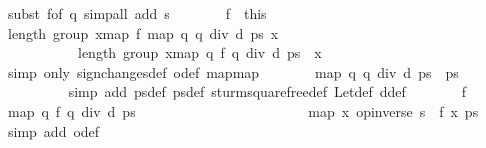 \begin{isabellebody}
\ {\isacharparenleft}subst\ f{\isacharbrackleft}of\ q{\isacharbrackright}{\isacharcomma}\ simp{\isacharunderscore}all\ add{\isacharcolon}\ s{\isacharparenright}\isanewline
\ \ \ \ \isacommand{{\isacharbraceright}}\isamarkupfalse%
\ \isamarkupfalse%
\ f{\isacharprime}\ {\isacharequal}\ this\isanewline
\ \ \ \ \isamarkupfalse%
\ {\isachardoublequoteopen}length\ {\isacharparenleft}group\ {\isacharbrackleft}x{\isasymleftarrow}map\ f\ {\isacharparenleft}map\ {\isacharparenleft}{\isasymlambda}q{\isachardot}\ q\ div\ d{\isacharparenright}\ ps{\isacharparenright}{\isachardot}\ x\ {\isasymnoteq}\ {}{\isacharbrackright}{\isacharparenright}\ {\isacharminus}\ {}\ {\isacharequal}\ \isanewline
\ \ \ \ \ \ \ \ \ \ \ length\ {\isacharparenleft}group\ {\isacharbrackleft}x{\isasymleftarrow}map\ {\isacharparenleft}{\isasymlambda}q{\isachardot}\ f\ {\isacharparenleft}q\ div\ d{\isacharparenright}{\isacharparenright}\ ps\ {\isachardot}\ x\ {\isasymnoteq}\ {}{\isacharbrackright}{\isacharparenright}\ {\isacharminus}\ {}{\isachardoublequoteclose}\isanewline
\ \ \ \ \ \ \ \ \isamarkupfalse%
\ {\isacharparenleft}simp\ only{\isacharcolon}\ sign{\isacharunderscore}changes{\isacharunderscore}def\ o{\isacharunderscore}def\ map{\isacharunderscore}map{\isacharparenright}\isanewline
\ \ \ \ \isamarkupfalse%
\ \isamarkupfalse%
\ {\isachardoublequoteopen}map\ {\isacharparenleft}{\isasymlambda}q{\isachardot}\ q\ div\ d{\isacharparenright}\ ps\ {\isacharequal}\ ps{\isacharprime}{\isachardoublequoteclose}\ \isanewline
\ \ \ \ \ \ \ \ \isamarkupfalse%
\ {\isacharparenleft}simp\ add{\isacharcolon}\ ps{\isacharunderscore}def\ ps{\isacharprime}{\isacharunderscore}def\ sturm{\isacharunderscore}squarefree{\isacharprime}{\isacharunderscore}def\ Let{\isacharunderscore}def\ d{\isacharunderscore}def{\isacharparenright}\isanewline
\ \ \ \ \isamarkupfalse%
\ \isamarkupfalse%
\ f{\isacharprime}\ \isamarkupfalse%
\ {\isachardoublequoteopen}map\ {\isacharparenleft}{\isasymlambda}q{\isachardot}\ f\ {\isacharparenleft}q\ div\ d{\isacharparenright}{\isacharparenright}\ ps\ {\isacharequal}\ \isanewline
\ \ \ \ \ \ \ \ \ \ \ \ \ \ \ \ \ \ \ \ \ \ map\ {\isacharparenleft}{\isasymlambda}x{\isachardot}\ {\isacharparenleft}op{\isacharasterisk}{\isacharparenleft}inverse\ s{\isacharparenright}\ {\isasymcirc}\ f{\isacharparenright}\ x{\isacharparenright}\ ps{\isachardoublequoteclose}\ \isamarkupfalse%
\ {\isacharparenleft}simp\ add{\isacharcolon}\ o{\isacharunderscore}def{\isacharparenright}\isanewline

\end{isabellebody}
